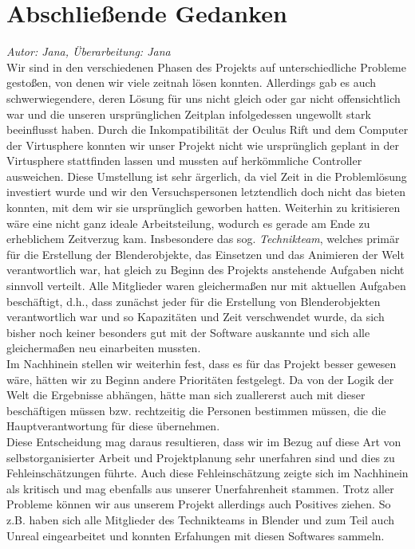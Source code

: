 \documentclass{Bericht}
\begin{document}
\section{Abschließende Gedanken} %
\textit{Autor: Jana, Überarbeitung: Jana}\\
	Wir sind in den verschiedenen Phasen des Projekts auf unterschiedliche Probleme gestoßen, von denen wir viele zeitnah lösen konnten. Allerdings gab es auch schwerwiegendere, deren Lösung für uns nicht gleich oder gar nicht offensichtlich war und die unseren ursprünglichen Zeitplan infolgedessen ungewollt stark beeinflusst haben.
	Durch die Inkompatibilität der Oculus Rift und dem Computer der Virtusphere konnten wir unser Projekt nicht wie ursprünglich geplant in der Virtusphere stattfinden lassen und mussten auf herkömmliche Controller ausweichen. Diese Umstellung ist sehr ärgerlich, da viel Zeit in die Problemlösung investiert wurde und wir den Versuchspersonen letztendlich doch nicht das bieten konnten, mit dem wir sie ursprünglich geworben hatten. 
Weiterhin zu kritisieren wäre eine nicht ganz ideale Arbeitsteilung, wodurch es gerade am Ende zu erheblichem Zeitverzug kam. Insbesondere das sog. \textit{Technikteam}, welches primär für die Erstellung der Blenderobjekte, das Einsetzen und das Animieren der Welt verantwortlich war, hat gleich zu Beginn des Projekts anstehende Aufgaben nicht sinnvoll verteilt. Alle Mitglieder waren gleichermaßen nur mit aktuellen Aufgaben beschäftigt, d.h., dass zunächst jeder für die Erstellung von Blenderobjekten verantwortlich war und so Kapazitäten und Zeit verschwendet wurde, da sich bisher noch keiner besonders gut mit der Software auskannte und sich alle gleichermaßen neu einarbeiten mussten. \\ 
Im Nachhinein stellen wir weiterhin fest, dass es für das Projekt besser gewesen wäre, hätten wir zu Beginn andere Prioritäten festgelegt. Da von der Logik der Welt die Ergebnisse abhängen, hätte man sich zuallererst auch mit dieser beschäftigen müssen bzw. rechtzeitig die Personen bestimmen müssen, die die Hauptverantwortung für diese übernehmen.\\
Diese Entscheidung mag daraus resultieren, dass wir im Bezug auf diese Art von selbstorganisierter Arbeit und Projektplanung sehr unerfahren sind und dies zu Fehleinschätzungen führte.
Auch diese Fehleinschätzung zeigte sich im Nachhinein als kritisch und mag ebenfalls aus unserer Unerfahrenheit stammen.
	Trotz aller Probleme können wir aus unserem Projekt allerdings auch Positives ziehen. So z.B. haben sich alle Mitglieder des Technikteams in Blender und zum Teil auch Unreal eingearbeitet und konnten Erfahungen mit diesen Softwares sammeln.\\
\end{document}
